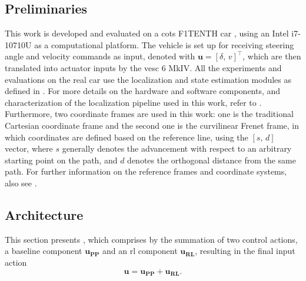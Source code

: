 \documentclass[letterpaper, conference]{IEEEtran}
\begin{document}
\subsection{Preliminaries} \label{ssec:preliminaries}
This work is developed and evaluated on a \gls{cots} F1TENTH car \cite{okelly2020f1tenthsim}, using an Intel i7-10710U as a computational platform.
The vehicle is set up for receiving steering angle and velocity commands as input, denoted with $\mathbf{u}=[\delta,\, v]^\top$, which are then translated into actuator inputs by the \gls{vesc} 6 MkIV.
All the experiments and evaluations on the real car use the localization and state estimation modules as defined in \cite{forzaeth}. 
For more details on the hardware and software components, and characterization of the localization pipeline used in this work, refer to \cite{forzaeth}.
Furthermore, two coordinate frames are used in this work: one is the traditional Cartesian coordinate frame and the second one is the curvilinear Frenet frame, in which coordinates are defined based on the reference line, using the $\left[s,\,d\right]$ vector, where $s$ generally denotes the advancement with respect to an arbitrary starting point on the path, and $d$ denotes the orthogonal distance from the same path. For further information on the reference frames and coordinate systems, also see \cite{forzaeth}.

\subsection{{\namealgo} Architecture} \label{ssec:res_ctrl_arch}
This section presents {\namealgo}, which comprises by the summation of two control actions, a baseline component $\mathbf{u_{PP}}$ and an \gls{rl} component $\mathbf{u_{RL}}$, resulting in the final input action 
\begin{equation} \label{eq:control_structure}
\mathbf{u} = \mathbf{u_{PP}} + \mathbf{u_{RL}}.
\end{equation}
\end{document}
